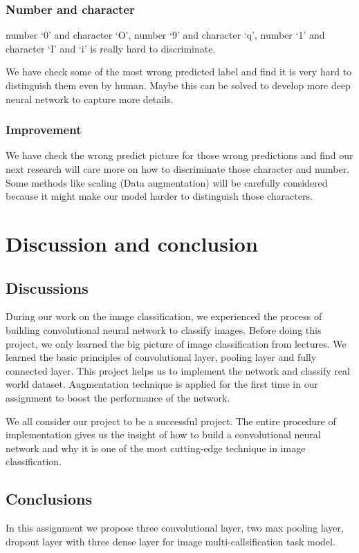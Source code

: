 \documentclass[twoside,twocolumn,10.8pt]{article}
\begin{document}
\subsubsection{Number and character}

number ‘0’ and character ‘O’, number ‘9’ and character ‘q’, number ‘1’ and character ‘I’ and ‘i’ is really hard to discriminate.

\noindent We have check some of the most wrong predicted label and find it is very hard to distinguish them even by human. Maybe this can be solved to develop more deep neural network to capture more details.

\subsubsection{Improvement}

We have check the wrong predict picture for those wrong predictions and find our next research will care more on how to discriminate those character and number. Some methods like scaling (Data augmentation) will be carefully considered because it might make our model harder to distinguish those characters.


\section{Discussion and conclusion}
\subsection{Discussions}

During our work on the image classification, we experienced the process of building convolutional neural network to classify images. Before doing this project, we only learned the big picture of image classification from lectures. We learned the basic principles of convolutional layer, pooling layer and fully connected layer. This project helps us to implement the network and classify real world dataset. Augmentation technique is applied for the first time in our assignment to boost the performance of the network.

\noindent We all consider our project to be a successful project. The entire procedure of implementation gives us the insight of how to build a convolutional neural network and why it is one of the most cutting-edge technique in image classification.

\subsection{Conclusions}
\noindent In this assignment we propose three convolutional layer, two max pooling layer, dropout layer with three dense layer for image multi-callsification task model.
\end{document}
